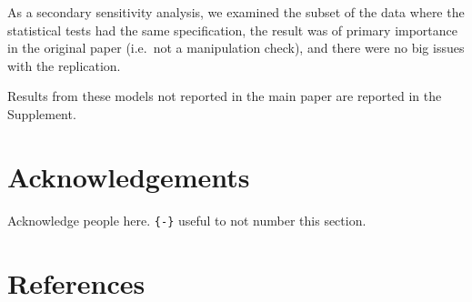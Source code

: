 \documentclass[
  english,
  a4paper,
]{article}
\begin{document}
As a secondary sensitivity analysis, we examined the subset of the data where the statistical tests had the same specification, the result was of primary importance in the original paper (i.e.~not a manipulation check), and there were no big issues with the replication.

Results from these models not reported in the main paper are reported in the Supplement.

\hypertarget{acknowledgements}{%
\section*{Acknowledgements}\label{acknowledgements}}

Acknowledge people here. \texttt{\{-\}} useful to not number this section.

\hypertarget{references}{%
\section*{References}\label{references}}
\end{document}
